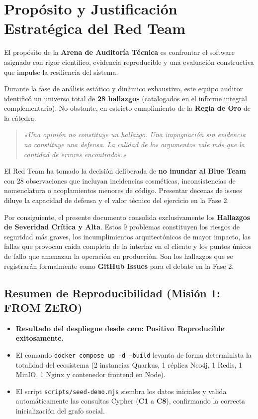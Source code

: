 \documentclass[10pt,a4paper]{article}
\newcommand{\badgePositivo}{\colorbox{green!20}{\textcolor{green!60!black}{\textbf{\footnotesize Positivo}}}}
\begin{document}
\newpage
\tableofcontents
\newpage

\section{Propósito y Justificación Estratégica del Red Team}

El propósito de la \textbf{Arena de Auditoría Técnica} es confrontar el software asignado con rigor científico, evidencia reproducible y una evaluación constructiva que impulse la resiliencia del sistema.

Durante la fase de análisis estático y dinámico exhaustivo, este equipo auditor identificó un universo total de \textbf{28 hallazgos} (catalogados en el informe integral complementario). No obstante, en estricto cumplimiento de la \textbf{Regla de Oro} de la cátedra:
\begin{quote}
\textit{«Una opinión no constituye un hallazgo. Una impugnación sin evidencia no constituye una defensa. La calidad de los argumentos vale más que la cantidad de errores encontrados.»}
\end{quote}

El Red Team ha tomado la decisión deliberada de \textbf{no inundar al Blue Team} con 28 observaciones que incluyan incidencias cosméticas, inconsistencias de nomenclatura o acoplamientos menores de código. Presentar decenas de issues diluye la capacidad de defensa y el valor técnico del ejercicio en la Fase 2.

Por consiguiente, el presente documento consolida exclusivamente los \textbf{Hallazgos de Severidad Crítica y Alta}. Estos 9 problemas constituyen los riesgos de seguridad más graves, los incumplimientos arquitectónicos de mayor impacto, las fallas que provocan caída completa de la interfaz en el cliente y los puntos únicos de fallo que amenazan la operación en producción. Son los hallazgos que se registrarán formalmente como \textbf{GitHub Issues} para el debate en la Fase 2.

\subsection{Resumen de Reproducibilidad (Misión 1: FROM ZERO)}
\begin{itemize}[leftmargin=*]
    \item \textbf{Resultado del despliegue desde cero:} \badgePositivo\ \textbf{Reproducible exitosamente.}
    \item El comando \texttt{docker compose up -d --build} levanta de forma determinista la totalidad del ecosistema (2 instancias Quarkus, 1 réplica Neo4j, 1 Redis, 1 MinIO, 1 Nginx y contenedor frontend en Node).
    \item El script \texttt{scripts/seed-demo.mjs} siembra los datos iniciales y valida automáticamente las consultas Cypher (\textbf{C1} a \textbf{C8}), confirmando la correcta inicialización del grafo social.
\end{itemize}
\end{document}
